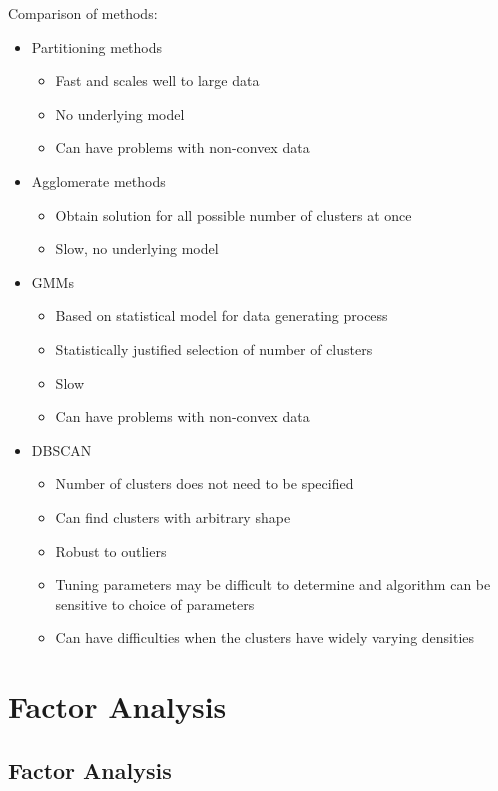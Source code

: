 \documentclass[a4paper]{article}
\begin{document}
Comparison of methods:
\begin{itemize}
    \item Partitioning methods
    \begin{itemize}
        \item Fast and scales well to large data
        \item No underlying model
        \item Can have problems with non-convex data
    \end{itemize}
    \item Agglomerate methods
    \begin{itemize}
        \item Obtain solution for all possible number of clusters at once
        \item Slow, no underlying model
    \end{itemize}
    \item GMMs
    \begin{itemize}
        \item Based on statistical model for data generating process
        \item Statistically justified selection of number of clusters
        \item Slow
        \item Can have problems with non-convex data
    \end{itemize}
    \item DBSCAN
    \begin{itemize}
        \item Number of clusters does not need to be specified
        \item Can find clusters with arbitrary shape
        \item Robust to outliers
        \item Tuning parameters may be difficult to determine and algorithm can be sensitive to choice of parameters
        \item Can have difficulties when the clusters have widely varying densities
    \end{itemize}
\end{itemize}

\section{Factor Analysis}

\subsection{Factor Analysis}
\end{document}
